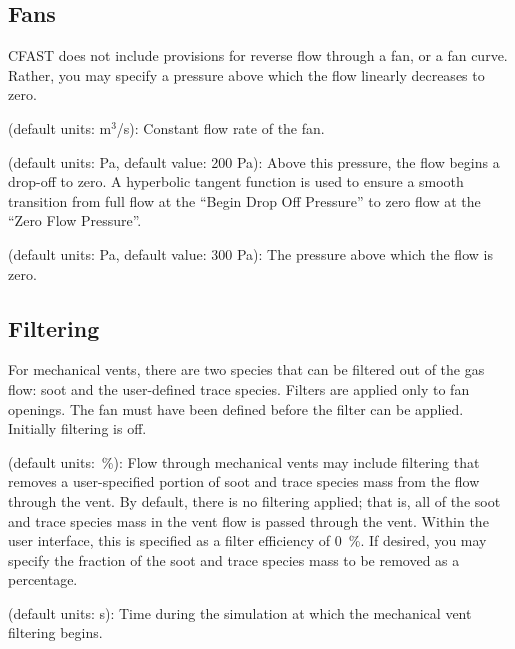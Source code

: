 \subsection{Fans}
\label{info:VENT4}
CFAST does not include provisions for reverse flow through a fan, or a fan curve. Rather, you may specify a pressure above which the flow linearly decreases to zero.
\begin{description}
\label{Mech Flow Rate}
\item[Flow Rate] (default units: m$^3$/s): Constant flow rate of the fan.
\label{Mech Begin Drop Off Pressure}
\item[Begin Drop Off Pressure] (default units: Pa, default value: 200 Pa): Above this pressure, the flow begins a drop-off to zero. A hyperbolic tangent function is used to ensure a smooth transition from full flow at the ``Begin Drop Off Pressure'' to zero flow at the ``Zero Flow Pressure''.
\label{Mech Zero Flow Pressure}
\item[Zero Flow Pressure] (default units: Pa, default value: 300 Pa): The pressure above which the flow is zero.
\end{description}




\subsection{Filtering}
\label{info:VENT5}
For mechanical vents, there are two species that can be filtered out of the gas flow: soot and the user-defined trace species. Filters are applied only to fan openings. The fan must have been defined before the filter can be applied. Initially filtering is off.
\begin{description}
\label{Mech Filter Efficiency}
\item[Filter Efficiency] (default units:~\%): Flow through mechanical vents may include filtering that removes a user-specified portion of soot and trace species mass from the flow through the vent.  By default, there is no filtering applied; that is, all of the soot and trace species mass in the vent flow is passed through the vent. Within the user interface, this is specified as a filter efficiency of 0~\%.  If desired, you may specify the fraction of the soot and trace species mass to be removed as a percentage.
\label{Mech Begin Filtering At Time}
\item[Begin Filtering At Time] (default units: s): Time during the simulation at which the mechanical vent filtering begins.
\end{description}

